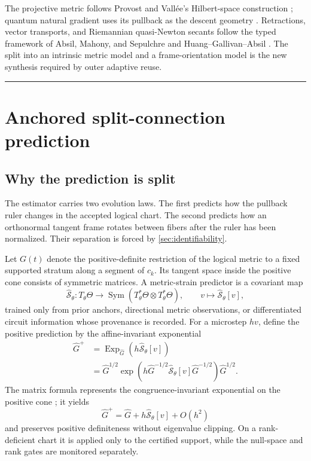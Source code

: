 \documentclass[10pt,twocolumn]{article}
\newcommand{\cref}[1]{\autoref{#1}}
\theoremstyle{definition}
\theoremstyle{remark}
\newcommand{\conceptbreak}{\par\vspace{0.45em}\noindent\textcolor{navy!55}{\rule{\columnwidth}{0.35pt}}\vspace{0.35em}\par}
\newcommand{\Exp}{\operatorname{Exp}}
\begin{document}
\begin{litbox}
The projective metric follows Provost and Vall\'ee's Hilbert-space construction \cite{Provost1980}; quantum natural gradient uses its pullback as the descent geometry \cite{Stokes2020}.  Retractions, vector transports, and Riemannian quasi-Newton secants follow the typed framework of Absil, Mahony, and Sepulchre and Huang--Gallivan--Absil \cite{Absil2008,Huang2015,Huang2018}.  The split into an intrinsic metric model and a frame-orientation model is the new synthesis required by outer adaptive reuse.
\end{litbox}

\conceptbreak

\section{Anchored split-connection prediction}
\label{sec:prediction}

\subsection{Why the prediction is split}

The estimator carries two evolution laws.  The first predicts how the pullback ruler changes in the accepted logical chart.  The second predicts how an orthonormal tangent frame rotates between fibers after the ruler has been normalized.  Their separation is forced by \cref{sec:identifiability}.

Let $G(t)$ denote the positive-definite restriction of the logical metric to a fixed supported stratum along a segment of $c_k$.  Its tangent space inside the positive cone consists of symmetric matrices.  A metric-strain predictor is a covariant map
\begin{equation}
 \widehat{\mathcal S}_{\theta}:T_\theta\Theta\longrightarrow\operatorname{Sym}(T_\theta^*\Theta\otimes T_\theta^*\Theta),
 \qquad v\longmapsto\widehat{\mathcal S}_{\theta}[v],
 \label{eq:strainmap}
\end{equation}
trained only from prior anchors, directional metric observations, or differentiated circuit information whose provenance is recorded.  For a microstep $h v$, define the positive prediction by the affine-invariant exponential
\begin{align}
 \widehat G^{+}
 &=\Exp_{\widehat G}\!\left(h\widehat{\mathcal S}_{\theta}[v]\right)\nonumber\\
 &=\widehat G^{1/2}
 \exp\!\left(h\widehat G^{-1/2}\widehat{\mathcal S}_{\theta}[v]\widehat G^{-1/2}\right)
 \widehat G^{1/2}.
 \label{eq:metricexp}
\end{align}
The matrix formula represents the congruence-invariant exponential on the positive cone \cite{Moakher2005}; it yields
\begin{equation}
 \widehat G^+=\widehat G+h\widehat{\mathcal S}_{\theta}[v]+O(h^2)
 \label{eq:metriclocal}
\end{equation}
and preserves positive definiteness without eigenvalue clipping.  On a rank-deficient chart it is applied only to the certified support, while the null-space and rank gates are monitored separately.
\end{document}
